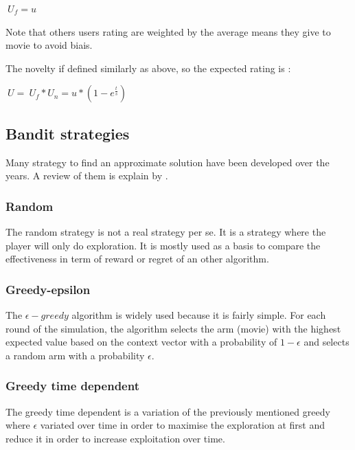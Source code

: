 \documentclass[letterpaper]{article}
\begin{document}
\begin{center}
	$ \ U_{f} = u $ 
\end{center}

Note that others users rating are weighted by the average means they give to movie to avoid biais.

The novelty if defined similarly as above, so the expected rating is :

\begin{center}
	$ \ U = \ U_{f} *  U_{n} = u * (1 - e^{\frac{t}{s}}) $ 
\end{center}



\subsection{Bandit strategies}

Many strategy to find an approximate solution have been developed over the years. A review of them is explain by \cite{kuleshov2014algorithms}.

\subsubsection{Random}

The random strategy is not a real strategy per se. It is a strategy where the player will only do exploration. It is mostly used as a basis to compare the effectiveness in term of reward or regret of an other algorithm.

\subsubsection{Greedy-epsilon}

The $\epsilon-greedy$ algorithm is widely used because it is fairly simple. For each round of the simulation, the algorithm selects the arm (movie) with the highest expected value based on the context vector with a probability of $1-\epsilon$ and selects a random arm with a probability $\epsilon$.

\subsubsection{Greedy time dependent}

The greedy time dependent is a variation of the previously mentioned greedy where $\epsilon$ variated over time in order to maximise the exploration at first and reduce it in order to increase exploitation over time.
\end{document}
